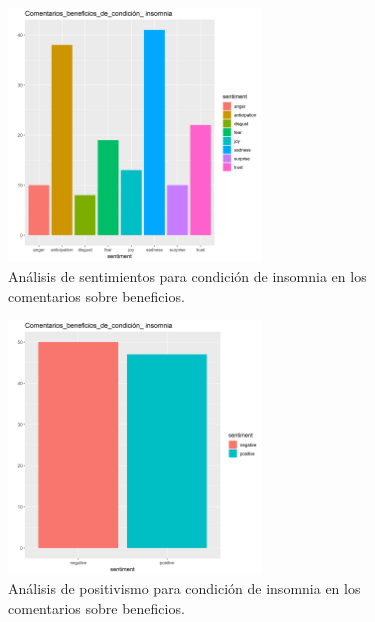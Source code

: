 \documentclass[spanish,]{article}
\begin{document}
\begin{figure}[h]
    \centering
    \includegraphics[width=0.6\textwidth]{figuras/sentimientos/Ainsomnia1.png}
    \caption{Análisis de sentimientos para condición de insomnia en los comentarios sobre beneficios.}
    \label{fig:sentimientos:21}
\end{figure}

\begin{figure}[h]
    \centering
    \includegraphics[width=0.6\textwidth]{figuras/sentimientos/Ainsomnia2.png}
    \caption{Análisis de positivismo para condición de insomnia en los comentarios sobre beneficios.}
    \label{fig:sentimientos:22}
\end{figure}
\end{document}
